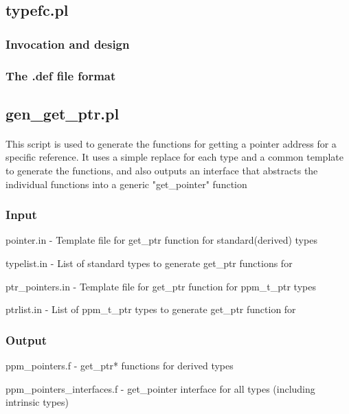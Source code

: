 \documentclass{article}
\begin{document}
\subsection{typefc.pl}
\label{sec.typefc}
\paragraph{}
\subsubsection{Invocation and design}
\subsubsection{The .def file format}

\subsection{gen\_get\_ptr.pl}
\paragraph{}
This script is used to generate the functions for getting a pointer address for a specific reference. It uses a simple replace for each type and a common template to generate the functions, and also outputs an interface that abstracts the individual functions into a generic "get\_pointer" function
\subsubsection{Input}
\begin{list}{}{}
\item pointer.in - Template file for get\_ptr function for standard(derived) types
\item typelist.in - List of standard types to generate get\_ptr functions for
\item ptr\_pointers.in - Template file for get\_ptr function for ppm\_t\_ptr types
\item ptrlist.in - List of ppm\_t\_ptr types to generate get\_ptr function for
\end{list}
\subsubsection{Output}
\begin{list}{}{}
\item ppm\_pointers.f - get\_ptr* functions for derived types
\item ppm\_pointers\_interfaces.f - get\_pointer interface for all types (including intrinsic types)
\end{list}
\end{document}

